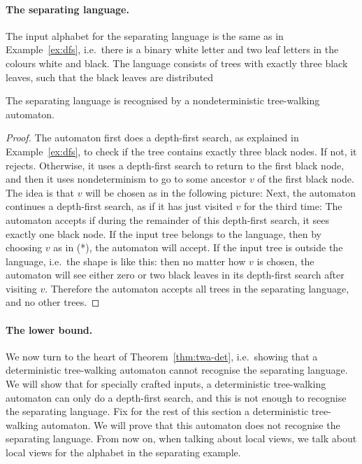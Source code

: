 \paragraph*{The separating language.} 
The input alphabet for the separating language is the same as in Example~\ref{ex:dfs}, i.e.~there is a binary white letter and  two leaf letters in the colours white and black. 
The language consists of trees with exactly three black leaves, such that  the  black leaves are distributed  
\begin{lemma}\label{lem:ntwa}
The separating language is recognised by a nondeterministic tree-walking automaton.
\end{lemma}
\begin{proof}
The automaton first does a depth-first search, as explained in Example~\ref{ex:dfs}, to check if the tree contains exactly three black nodes. If not, it rejects. Otherwise, it uses a depth-first search to return to the first black node, and then it uses nondeterminism to go to some  ancestor $v$ of the first black node. The  idea is that $v$  will be chosen as in the following picture:
Next, the automaton continues a depth-first search, as if it has just visited $v$ for the third time: 
The automaton accepts if during the remainder of  this depth-first search, it sees exactly  one black node.  If the input tree belongs to the language,  then by choosing $v$ as in (*), the automaton will accept. If the input tree is outside the language, i.e.~the shape is like this: 
 then no matter how $v$ is chosen, the automaton will see either zero or two black leaves in its depth-first search after visiting $v$. Therefore the automaton accepts all trees in the separating language, and no other trees.
\end{proof}

\paragraph*{The lower bound.}
We now turn to the heart of Theorem~\ref{thm:twa-det}, i.e.~showing that a deterministic tree-walking automaton cannot recognise the separating language. We will show that  for specially crafted  inputs, a deterministic tree-walking automaton can only do a depth-first search, and this is not enough to recognise the separating language. Fix for the rest of this section a deterministic tree-walking automaton. We will prove that this automaton does not recognise the separating language. From now on, when talking about local views, we talk about local views for the alphabet in the separating example.

